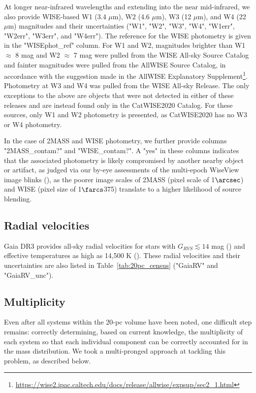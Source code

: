 \documentclass[twocolumn,tighten,twocolappendix]{aastex631}
\begin{document}
At longer near-infrared wavelengths and extending into the near mid-infrared, we also provide WISE-based W1 (3.4 $\mu$m), W2 (4.6 $\mu$m), W3 (12 $\mu$m), and W4 (22 $\mu$m) magnitudes and their uncertainties ("W1", "W2", "W3", "W4", "W1err", "W2err", "W3err", and "W4err"). The reference for the WISE photometry is given in the "WISEphot\_ref" column. For W1 and W2, magnitudes brighter than W1 $\approx$ 8 mag and W2 $\approx$ 7 mag were pulled from the WISE All-sky Source Catalog and fainter magnitudes were pulled from the AllWISE Source Catalog, in accordance with the suggestion made in the AllWISE Explanatory Supplement\footnote{\url {https://wise2.ipac.caltech.edu/docs/release/allwise/expsup/sec2\_1.html}}. Photometry at W3 and W4 was pulled from the WISE All-sky Release. The only exceptions to the above are objects that were not detected in either of these releases and are instead found only in the CatWISE2020 Catalog. For these sources, only W1 and W2 photometry is presented, as CatWISE2020 has no W3 or W4 photometry.

In the case of 2MASS and WISE photometry, we further provide columns "2MASS\_contam?" and "WISE\_contam?". A "yes" in these columns indicates that the associated photometry is likely compromised by another nearby object or artifact, as judged via our by-eye assessments of the multi-epoch WiseView image blinks (\citealt{caselden2018}), as the poorer image scales of 2MASS (pixel scale of 1$\arcsec$) and WISE (pixel size of 1$\farcs$375) translate to a higher likelihood of source blending.

\subsection{Radial velocities\label{sec:radial_velocities}}

Gaia DR3 provides all-sky radial velocities for stars with $G_{RVS} \lesssim 14$ mag (\citealt{katz2022}) and effective temperatures as high as 14,500 K (\citealt{blomme2022}). These radial velocities and their uncertainties are also listed in Table~\ref{tab:20pc_census} ("GaiaRV" and "GaiaRV\_unc").

\subsection{Multiplicity}

Even after all systems within the 20-pc volume have been noted, one difficult step remains: correctly determining, based on current knowledge, the multiplicity of each system so that each individual component can be correctly accounted for in the mass distribution. We took a multi-pronged approach at tackling this problem, as described below.
\end{document}
